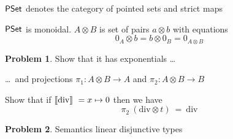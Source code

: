 \documentclass[a4paper, 11pt]{article}
\theoremstyle{definition}
\newtheorem{problem}{Problem}
\begin{document}
        $\mathsf{PSet}$ denotes the category of pointed sets and strict maps

        $\mathsf{PSet}$ is monoidal. $A \otimes B$ is set of pairs $a \otimes b$ with
        equations
        \[
                0_A \otimes b = b \otimes 0_B = 0_{A \otimes B}
        \]

\begin{problem}
        Show that it has exponentials \dots

        \dots\ and projections $\pi_1 : A \otimes B \to A$ and $\pi_2 : A
        \otimes B \to B$

        Show that if $\llbracket \mathrm{div} \rrbracket\ = x \mapsto 0$ then we have
        \[
                \pi_2\ (\mathrm{div} \otimes t)\ =\ \mathrm{div}
        \]
\end{problem}

\begin{problem}
        Semantics linear disjunctive types
\end{problem}
\newcommand{\typeI}{\typefont{I}}
\end{document}
